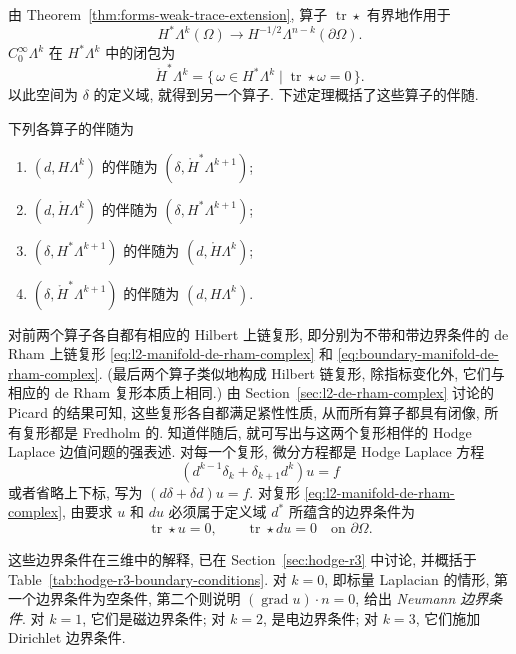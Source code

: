 {由 Theorem~\ref{thm:forms-weak-trace-extension}, 算子 $\operatorname{tr}\star$ 有界地作用于}
\[
H^*\Lambda^k(\Omega)\to H^{-1/2}\Lambda^{n-k}(\partial\Omega).
\]
{$C_0^\infty\Lambda^k$ 在 $H^*\Lambda^k$ 中的闭包为}
\[
\mathring H^*\Lambda^k=\{\,\omega\in H^*\Lambda^k\mid\operatorname{tr}\star\omega=0\,\}.
\]
{以此空间为 $\delta$ 的定义域, 就得到另一个算子. 下述定理概括了这些算子的伴随.}

\begin{Theorem}\label{thm:exterior-codifferential-adjoints}
{下列各算子的伴随为}
\begin{enumerate}
\item{$(d,H\Lambda^k)$ 的伴随为 $(\delta,\mathring H^*\Lambda^{k+1})$;}
\item{$(d,\mathring H\Lambda^k)$ 的伴随为 $(\delta,H^*\Lambda^{k+1})$;}
\item{$(\delta,H^*\Lambda^{k+1})$ 的伴随为 $(d,\mathring H\Lambda^k)$;}
\item{$(\delta,\mathring H^*\Lambda^{k+1})$ 的伴随为 $(d,H\Lambda^k)$.}
\end{enumerate}
\end{Theorem}

{对前两个算子各自都有相应的 Hilbert 上链复形, 即分别为不带和带边界条件的 de Rham 上链复形 \eqref{eq:l2-manifold-de-rham-complex} 和 \eqref{eq:boundary-manifold-de-rham-complex}. (最后两个算子类似地构成 Hilbert 链复形, 除指标变化外, 它们与相应的 de Rham 复形本质上相同.) 由 Section~\ref{sec:l2-de-rham-complex} 讨论的 Picard 的结果可知, 这些复形各自都满足紧性性质, 从而所有算子都具有闭像, 所有复形都是 Fredholm 的. 知道伴随后, 就可写出与这两个复形相伴的 Hodge Laplace 边值问题的强表述. 对每一个复形, 微分方程都是 Hodge Laplace 方程}
\[
(d^{k-1}\delta_k+\delta_{k+1}d^k)u=f
\]
{或者省略上下标, 写为 $(d\delta+\delta d)u=f$. 对复形 \eqref{eq:l2-manifold-de-rham-complex}, 由要求 $u$ 和 $du$ 必须属于定义域 $d^*$ 所蕴含的边界条件为}
\[
\operatorname{tr}\star u=0,\qquad\operatorname{tr}\star du=0\quad\text{on }\partial\Omega.
\]

{这些边界条件在三维中的解释, 已在 Section~\ref{sec:hodge-r3} 中讨论, 并概括于 Table~\ref{tab:hodge-r3-boundary-conditions}. 对 $k=0$, 即标量 Laplacian 的情形, 第一个边界条件为空条件, 第二个则说明 $(\operatorname{grad}u)\cdot n=0$, 给出 \emph{Neumann 边界条件}. 对 $k=1$, 它们是磁边界条件; 对 $k=2$, 是电边界条件; 对 $k=3$, 它们施加 Dirichlet 边界条件.}

